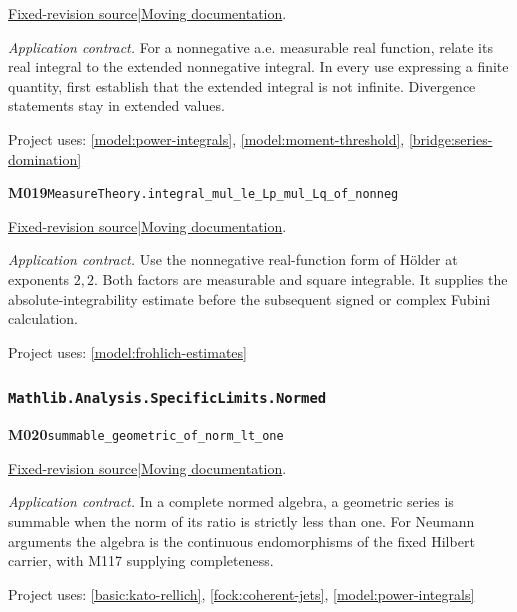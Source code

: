 \documentclass[11pt,a4paper]{article}
\theoremstyle{definition}
\theoremstyle{remark}
\begin{document}
\href{https://github.com/leanprover-community/mathlib4/blob/9bac2d0692944a775113f7c130fd5e5b4608a854/Mathlib/MeasureTheory/Integral/Bochner/Basic.lean}{Fixed-revision source}\quad|\quad\href{https://leanprover-community.github.io/mathlib4_docs/Mathlib/MeasureTheory/Integral/Bochner/Basic.html#MeasureTheory.integral_eq_lintegral_of_nonneg_ae}{Moving documentation}.\par
\noindent\textit{Application contract.} For a nonnegative a.e. measurable real function, relate its real integral to the extended nonnegative integral. In every use expressing a finite quantity, first establish that the extended integral is not infinite. Divergence statements stay in extended values.\par
{\small Project uses: \ref{model:power-integrals}, \ref{model:moment-threshold}, \ref{bridge:series-domination}}\par\medskip

\noindent\textbf{M019}\label{base:M019}\quad\nolinkurl{MeasureTheory.integral_mul_le_Lp_mul_Lq_of_nonneg}

\href{https://github.com/leanprover-community/mathlib4/blob/9bac2d0692944a775113f7c130fd5e5b4608a854/Mathlib/MeasureTheory/Integral/Bochner/Basic.lean}{Fixed-revision source}\quad|\quad\href{https://leanprover-community.github.io/mathlib4_docs/Mathlib/MeasureTheory/Integral/Bochner/Basic.html#MeasureTheory.integral_mul_le_Lp_mul_Lq_of_nonneg}{Moving documentation}.\par
\noindent\textit{Application contract.} Use the nonnegative real-function form of H\"older at exponents $2,2$. Both factors are measurable and square integrable. It supplies the absolute-integrability estimate before the subsequent signed or complex Fubini calculation.\par
{\small Project uses: \ref{model:frohlich-estimates}}\par\medskip

\subsubsection*{\nolinkurl{Mathlib.Analysis.SpecificLimits.Normed}}
\noindent\textbf{M020}\label{base:M020}\quad\nolinkurl{summable_geometric_of_norm_lt_one}

\href{https://github.com/leanprover-community/mathlib4/blob/9bac2d0692944a775113f7c130fd5e5b4608a854/Mathlib/Analysis/SpecificLimits/Normed.lean}{Fixed-revision source}\quad|\quad\href{https://leanprover-community.github.io/mathlib4_docs/Mathlib/Analysis/SpecificLimits/Normed.html#summable_geometric_of_norm_lt_one}{Moving documentation}.\par
\noindent\textit{Application contract.} In a complete normed algebra, a geometric series is summable when the norm of its ratio is strictly less than one. For Neumann arguments the algebra is the continuous endomorphisms of the fixed Hilbert carrier, with M117 supplying completeness.\par
{\small Project uses: \ref{basic:kato-rellich}, \ref{fock:coherent-jets}, \ref{model:power-integrals}}\par\medskip
\end{document}
